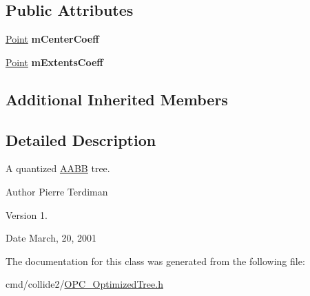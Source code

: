 \subsection*{Public Attributes}
\begin{DoxyCompactItemize}
\item 
\hyperlink{classPoint}{Point} {\bfseries m\+Center\+Coeff}\hypertarget{classAABBQuantizedTree_a0ac59d4d4e7476474f7e806deb5db8f5}{}\label{classAABBQuantizedTree_a0ac59d4d4e7476474f7e806deb5db8f5}

\item 
\hyperlink{classPoint}{Point} {\bfseries m\+Extents\+Coeff}\hypertarget{classAABBQuantizedTree_a44e03a9e9bc58969e9941862d85295aa}{}\label{classAABBQuantizedTree_a44e03a9e9bc58969e9941862d85295aa}

\end{DoxyCompactItemize}
\subsection*{Additional Inherited Members}


\subsection{Detailed Description}
A quantized \hyperlink{classAABB}{A\+A\+BB} tree.

\begin{DoxyAuthor}{Author}
Pierre Terdiman 
\end{DoxyAuthor}
\begin{DoxyVersion}{Version}
1. 
\end{DoxyVersion}
\begin{DoxyDate}{Date}
March, 20, 2001 
\end{DoxyDate}


The documentation for this class was generated from the following file\+:\begin{DoxyCompactItemize}
\item 
cmd/collide2/\hyperlink{OPC__OptimizedTree_8h}{O\+P\+C\+\_\+\+Optimized\+Tree.\+h}\end{DoxyCompactItemize}
